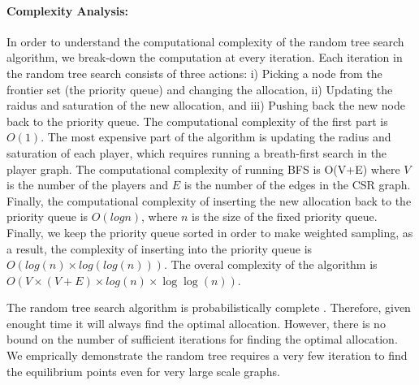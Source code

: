 \paragraph{Complexity Analysis:}
In order to understand the computational complexity of the random tree search algorithm, we break-down the computation at every iteration. Each iteration in the random tree search consists of three actions:
i) Picking a node from the frontier set (the priority queue) and changing the allocation,
ii) Updating the raidus and saturation of the new allocation, and
iii) Pushing back the new node back to the priority queue.
The computational complexity of the first part is $O(1)$. The most expensive part of the algorithm is updating the radius and saturation of each player, which requires running a breath-first search in the player graph. The computational complexity of running BFS is O(V+E) where $V$ is the number of the players and $E$ is the number of the edges in the CSR graph. Finally, the computational complexity of inserting the new allocation back to the priority queue is $O(log n)$, where $n$ is the size of the fixed priority queue. Finally, we keep the priority queue sorted in order to make weighted sampling, as a result, the complexity of inserting into the priority queue is $O(log(n)\times log(log(n)))$. The overal complexity of the algorithm is $O(V\times(V+E)\times log(n)\times \log\log(n))$.

The random tree search algorithm is probabilistically complete \cite{Lavalle2006}. Therefore, given enought time it will always find the optimal allocation. However, there is no bound on the number of sufficient iterations for finding the optimal allocation. We emprically demonstrate the random tree requires a very few iteration to find the equilibrium points even for very large scale graphs.
